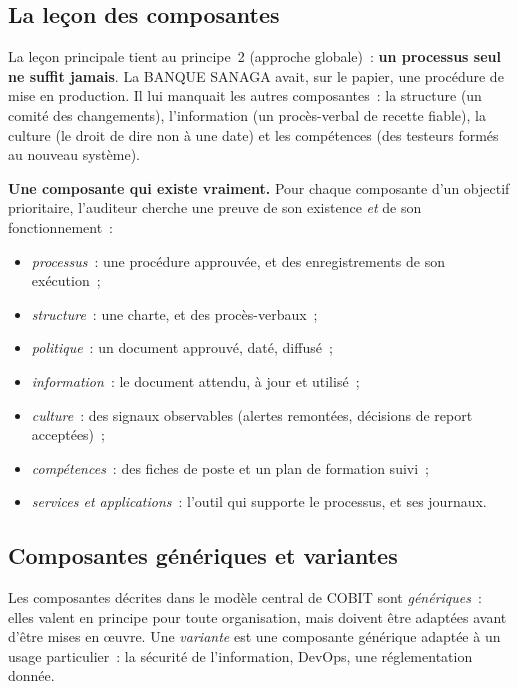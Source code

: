 \subsection{La leçon des composantes}

La leçon principale tient au principe~2 (approche globale)~: \textbf{un
processus seul ne suffit jamais}. La BANQUE SANAGA avait, sur le papier,
une procédure de mise en production. Il lui manquait les autres
composantes~: la structure (un comité des changements), l'information (un
procès-verbal de recette fiable), la culture (le droit de dire non à une
date) et les compétences (des testeurs formés au nouveau système).

\begin{boxprocedure}
\textbf{Une composante qui existe vraiment.} Pour chaque composante d'un
objectif prioritaire, l'auditeur cherche une preuve de son existence
\emph{et} de son fonctionnement~:
\begin{itemize}
    \item \emph{processus}~: une procédure approuvée, et des
          enregistrements de son exécution~;
    \item \emph{structure}~: une charte, et des procès-verbaux~;
    \item \emph{politique}~: un document approuvé, daté, diffusé~;
    \item \emph{information}~: le document attendu, à jour et utilisé~;
    \item \emph{culture}~: des signaux observables (alertes remontées,
          décisions de report acceptées)~;
    \item \emph{compétences}~: des fiches de poste et un plan de formation
          suivi~;
    \item \emph{services et applications}~: l'outil qui supporte le
          processus, et ses journaux.
\end{itemize}
\end{boxprocedure}

\subsection{Composantes génériques et variantes}

Les composantes décrites dans le modèle central de COBIT sont
\emph{génériques}~: elles valent en principe pour toute organisation, mais
doivent être adaptées avant d'être mises en œuvre. Une \emph{variante} est
une composante générique adaptée à un usage particulier~: la sécurité de
l'information, DevOps, une réglementation donnée.

